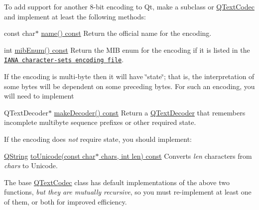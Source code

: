 To add support for another 8-\/bit encoding to Qt, make a subclass or \hyperlink{class_q_text_codec}{Q\-Text\-Codec} and implement at least the following methods\-: 
\begin{DoxyDescription}
\item[{\ttfamily const} char$\ast$ \hyperlink{class_q_text_codec_a5bf2c67878639a29dfd3d648b93f17a2}{name() const} ]Return the official name for the encoding. 
\item[{\ttfamily int} \hyperlink{class_q_text_codec_a6ab5696c11fafa78429074ae63a794e0}{mib\-Enum() const} ]Return the M\-I\-B enum for the encoding if it is listed in the \href{ftp://ftp.isi.edu/in-notes/iana/assignments/character-sets}{\tt I\-A\-N\-A character-\/sets encoding file}. 
\end{DoxyDescription}If the encoding is multi-\/byte then it will have \char`\"{}state\char`\"{}; that is, the interpretation of some bytes will be dependent on some preceding bytes. For such an encoding, you will need to implement 
\begin{DoxyDescription}
\item[{\ttfamily Q\-Text\-Decoder$\ast$} \hyperlink{class_q_text_codec_ad7f6bd53bcbf64bf6f2e75106d229e19}{make\-Decoder() const} ]Return a \hyperlink{class_q_text_decoder}{Q\-Text\-Decoder} that remembers incomplete multibyte sequence prefixes or other required state. 
\end{DoxyDescription}If the encoding does {\itshape not} require state, you should implement\-: 
\begin{DoxyDescription}
\item[{\ttfamily \hyperlink{class_q_string}{Q\-String}} \hyperlink{class_q_text_codec_a007974789d47a38acb95816cd5486c8c}{to\-Unicode(const char$\ast$ chars, int len) const} ]Converts {\itshape len} characters from {\itshape chars} to Unicode. 
\end{DoxyDescription}The base \hyperlink{class_q_text_codec}{Q\-Text\-Codec} class has default implementations of the above two functions, {\itshape but they are mutually recursive}, so you must re-\/implement at least one of them, or both for improved efficiency.

